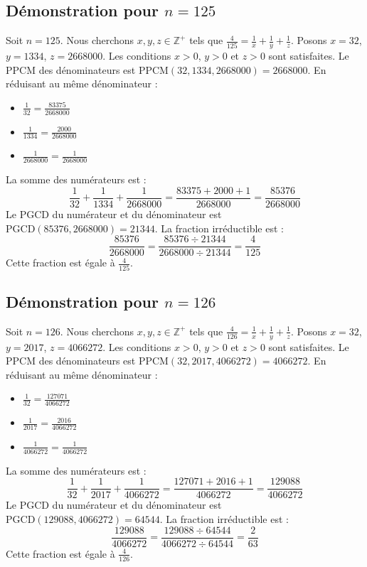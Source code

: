\documentclass[11pt,a4paper]{article}
\begin{document}
\subsection{Démonstration pour $n = 125$}
Soit $n = 125$. Nous cherchons $x, y, z \in \mathbb{Z}^{+}$ tels que $\frac{4}{125} = \frac{1}{x} + \frac{1}{y} + \frac{1}{z}$.
Posons $x = 32$, $y = 1334$, $z = 2668000$.
Les conditions $x > 0$, $y > 0$ et $z > 0$ sont satisfaites.
Le PPCM des dénominateurs est $\text{PPCM}(32, 1334, 2668000) = 2668000$.
En réduisant au même dénominateur :
\begin{itemize}
    \item $\frac{1}{32} = \frac{83375}{2668000}$
    \item $\frac{1}{1334} = \frac{2000}{2668000}$
    \item $\frac{1}{2668000} = \frac{1}{2668000}$
\end{itemize}
La somme des numérateurs est :
$$ \frac{1}{32} + \frac{1}{1334} + \frac{1}{2668000} = \frac{83375 + 2000 + 1}{2668000} = \frac{85376}{2668000} $$
Le PGCD du numérateur et du dénominateur est $\text{PGCD}(85376, 2668000) = 21344$.
La fraction irréductible est :
$$ \frac{85376}{2668000} = \frac{85376 \div 21344}{2668000 \div 21344} = \frac{4}{125} $$
Cette fraction est égale à $\frac{4}{125}$.

\subsection{Démonstration pour $n = 126$}
Soit $n = 126$. Nous cherchons $x, y, z \in \mathbb{Z}^{+}$ tels que $\frac{4}{126} = \frac{1}{x} + \frac{1}{y} + \frac{1}{z}$.
Posons $x = 32$, $y = 2017$, $z = 4066272$.
Les conditions $x > 0$, $y > 0$ et $z > 0$ sont satisfaites.
Le PPCM des dénominateurs est $\text{PPCM}(32, 2017, 4066272) = 4066272$.
En réduisant au même dénominateur :
\begin{itemize}
    \item $\frac{1}{32} = \frac{127071}{4066272}$
    \item $\frac{1}{2017} = \frac{2016}{4066272}$
    \item $\frac{1}{4066272} = \frac{1}{4066272}$
\end{itemize}
La somme des numérateurs est :
$$ \frac{1}{32} + \frac{1}{2017} + \frac{1}{4066272} = \frac{127071 + 2016 + 1}{4066272} = \frac{129088}{4066272} $$
Le PGCD du numérateur et du dénominateur est $\text{PGCD}(129088, 4066272) = 64544$.
La fraction irréductible est :
$$ \frac{129088}{4066272} = \frac{129088 \div 64544}{4066272 \div 64544} = \frac{2}{63} $$
Cette fraction est égale à $\frac{4}{126}$.
\end{document}

